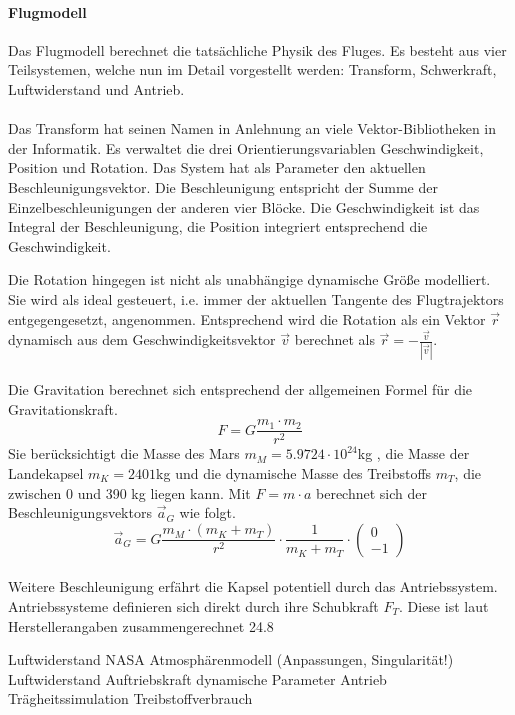 \paragraph{Flugmodell}
Das Flugmodell berechnet die tatsächliche Physik des Fluges. Es besteht aus vier Teilsystemen, welche nun im Detail vorgestellt werden: Transform, Schwerkraft, Luftwiderstand und Antrieb. \\ \\

Das Transform hat seinen Namen in Anlehnung an viele Vektor-Bibliotheken in der Informatik. Es verwaltet die drei Orientierungsvariablen Geschwindigkeit, Position und Rotation. Das System hat als Parameter den aktuellen Beschleunigungsvektor. Die Beschleunigung entspricht der Summe der Einzelbeschleunigungen der anderen vier Blöcke. Die Geschwindigkeit ist das Integral der Beschleunigung, die Position integriert entsprechend die Geschwindigkeit.

Die Rotation hingegen ist nicht als unabhängige dynamische Größe modelliert. Sie wird als ideal gesteuert, i.e. immer der aktuellen Tangente des Flugtrajektors entgegengesetzt, angenommen. Entsprechend wird die Rotation als ein Vektor $\vec r$ dynamisch aus dem Geschwindigkeitsvektor $\vec v$ berechnet als $\vec r = -\frac{\vec v}{|\vec v|}$.\\ \\

Die Gravitation berechnet sich entsprechend der allgemeinen Formel für die Gravitationskraft.
$$F = G \frac{m_1 \cdot m_2}{r^{2}} $$
Sie berücksichtigt die Masse des Mars $m_M = 5.9724 \cdot 10^{24}$kg \cite{NASA2016}, die Masse der Landekapsel $m_K = 2401$kg \cite{Wikipedia2016b} und die dynamische Masse des Treibstoffs $m_T$, die zwischen 0 und 390 kg \cite{Wikipedia2016b} liegen kann. Mit $F = m \cdot a$ berechnet sich der Beschleunigungsvektors $\vec a_G$ wie folgt.
$$\vec a_G = G \frac{m_M \cdot (m_K + m_T)}{r^{2}} \cdot \frac{1}{m_K + m_T} \cdot \left(\begin{array}{c} 0 \\ -1 \end{array}\right)$$\\

Weitere Beschleunigung erfährt die Kapsel potentiell durch das Antriebssystem. Antriebssysteme definieren sich direkt durch ihre Schubkraft $F_T$. Diese ist laut Herstellerangaben zusammengerechnet 24.8

	Luftwiderstand
		NASA Atmosphärenmodell (Anpassungen, Singularität!)
			Luftwiderstand
			Auftriebskraft
		dynamische Parameter
Antrieb
	Trägheitssimulation
	Treibstoffverbrauch